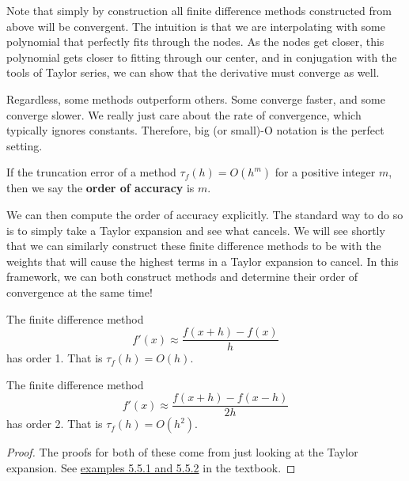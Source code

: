 \documentclass[11pt]{article}
\begin{document}
Note that simply by construction all finite difference methods constructed from above will be convergent. The intuition is that we are interpolating with some polynomial that perfectly fits through the nodes. As the nodes get closer, this polynomial gets closer to fitting through our center, and in conjugation with the tools of Taylor series, we can show that the derivative must converge as well.

Regardless, some methods outperform others. Some converge faster, and some converge slower. We really just care about the rate of convergence, which typically ignores constants. Therefore, big (or small)-O notation is the perfect setting. 

\begin{definition}
    If the truncation error of a method $\tau_f(h) = O(h^m)$ for a positive integer $m$, then we say the \textbf{order of accuracy} is $m$.
\end{definition}

We can then compute the order of accuracy explicitly. The standard way to do so is to simply take a Taylor expansion and see what cancels. We will see shortly that we can similarly construct these finite difference methods to be with the weights that will cause the highest terms in a Taylor expansion to cancel. In this framework, we can both construct methods and determine their order of convergence at the same time!

\begin{lemma}
    The finite difference method $$f'(x) \approx \frac{f(x+h)-f(x)}{h}$$ has order 1. That is $\tau_f(h) = O(h)$.
    \vspace{0.5cm}
    
    \noindent The finite difference method $$f'(x) \approx \frac{f(x+h)-f(x-h)}{2h}$$ has order 2. That is $\tau_f(h) = O(h^2)$.
\end{lemma}
\begin{proof}
    The proofs for both of these come from just looking at the Taylor expansion. See {\color{blue}\href{https://fncbook.com/fd-converge/}{examples 5.5.1 and 5.5.2}} in the textbook.
\end{proof}
\end{document}
